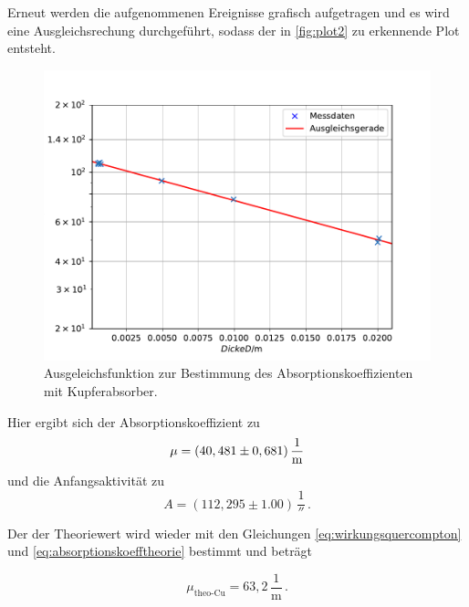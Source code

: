   Erneut werden die aufgenommenen Ereignisse grafisch aufgetragen und es wird eine Ausgleichsrechung durchgeführt, sodass der in \autoref{fig:plot2} zu erkennende Plot entsteht.

  \begin{figure}[H]
      \centering
      \includegraphics{figures/GammaKupfer2.pdf}
      \caption{Ausgeleichsfunktion zur Bestimmung des Absorptionskoeffizienten mit Kupferabsorber.}
      \label{fig:plot2}
  \end{figure}

Hier ergibt sich der Absorptionskoeffizient zu
\begin{equation*}
    \mu =  \left(40,481 \pm 0,681\right) \unit{\frac{1}{\meter}}
\end{equation*}
und die Anfangsaktivität zu
\begin{equation*}
    A = (112,295 \pm 1.00) \, \unit{\frac{1}{\second}} \,.
\end{equation*}

Der der Theoriewert wird wieder mit den Gleichungen \eqref{eq:wirkungsquercompton} und  \eqref{eq:absorptionskoefftheorie} bestimmt und beträgt%

\begin{equation*}
    \mu_{\text{theo-Cu}} = 63,2  \, \dfrac{1}{\unit{\meter}} \, .%
    \label{eq:absorpttheoCu}
\end{equation*}

